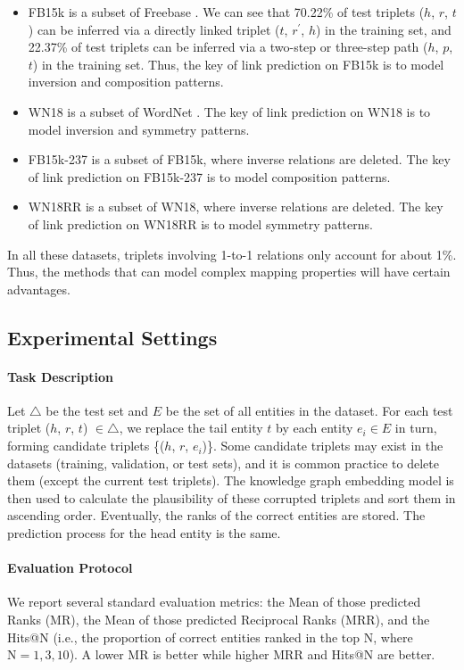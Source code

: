 \documentclass[conference]{IEEEtran}
\begin{document}
\begin{itemize}
	\item FB15k is a subset of Freebase \cite{Freebase}. We can see that 70.22\% of test triplets ($h$, $r$, $t$) can be inferred via a directly linked triplet ($t$, $r^{'}$, $h$) in the training set, and 22.37\% of test triplets can be inferred via a two-step or three-step path ($h$, $p$, $t$) in the training set. Thus, the key of link prediction on FB15k is to model inversion and composition patterns.
	\item WN18 is a subset of WordNet \cite{WordNet}. The key of link prediction on WN18 is to model inversion and symmetry patterns.
	\item FB15k-237 is a subset of FB15k, where inverse relations are deleted. The key of link prediction on FB15k-237 is to model composition patterns.
	\item WN18RR is a subset of WN18, where inverse relations are deleted. The key of link prediction on WN18RR is to model symmetry patterns.
\end{itemize}
In all these datasets, triplets involving 1-to-1 relations only account for about 1\%. Thus, the methods that can model complex mapping properties will have certain advantages.

\subsection{Experimental Settings}
\paragraph*{Task Description}
Let $\bigtriangleup$ be the test set and $E$ be the set of all entities in the dataset. For each test triplet ($h$, $r$, $t$) $\in \bigtriangleup$, we replace the tail entity $t$ by each entity $e_i \in E$ in turn, forming candidate triplets \{($h$, $r$, $e_i$)\}. Some candidate triplets may exist in the datasets (training, validation, or test sets), and it is common practice to delete them (except the current test triplets). The knowledge graph embedding model is then used to calculate the plausibility of these corrupted triplets and sort them in ascending order. Eventually, the ranks of the correct entities are stored. The prediction process for the head entity is the same.

\paragraph*{Evaluation Protocol}
We report several standard evaluation metrics: the Mean of those predicted Ranks (MR), the Mean of those predicted Reciprocal Ranks (MRR), and the Hits@N (i.e., the proportion of correct entities ranked in the top N, where $\text{N}=1, 3, 10$). A lower MR is better while higher MRR and Hits@N are better.
\end{document}
